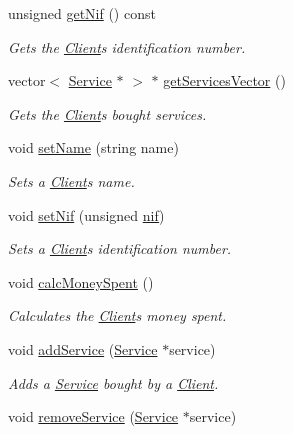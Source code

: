 \begin{DoxyCompactItemize}
unsigned \hyperlink{class_client_a35c9fed8cdb36d28fd5e51bd2aee852e}{get\+Nif} () const
\begin{DoxyCompactList}\small\item\em Gets the \hyperlink{class_client}{Client}\textquotesingle{}s identification number. \end{DoxyCompactList}\item 
vector$<$ \hyperlink{class_service}{Service} $\ast$ $>$ $\ast$ \hyperlink{class_client_a13ab3e2d37fde2de5b6a40d4523bb999}{get\+Services\+Vector} ()
\begin{DoxyCompactList}\small\item\em Gets the \hyperlink{class_client}{Client}\textquotesingle{}s bought services. \end{DoxyCompactList}\item 
void \hyperlink{class_client_a1c7f938360e23b3e0e52d17965f88725}{set\+Name} (string name)
\begin{DoxyCompactList}\small\item\em Sets a \hyperlink{class_client}{Client}\textquotesingle{}s name. \end{DoxyCompactList}\item 
void \hyperlink{class_client_a8d0ab1a3c654d361dacde7e1d2b92c94}{set\+Nif} (unsigned \hyperlink{class_client_a1c94dc96a56cb5032573fb1d528517c2}{nif})
\begin{DoxyCompactList}\small\item\em Sets a \hyperlink{class_client}{Client}\textquotesingle{}s identification number. \end{DoxyCompactList}\item 
void \hyperlink{class_client_a65027bc2da365dfdbbf0393ee2697586}{calc\+Money\+Spent} ()
\begin{DoxyCompactList}\small\item\em Calculates the \hyperlink{class_client}{Client}\textquotesingle{}s money spent. \end{DoxyCompactList}\item 
void \hyperlink{class_client_abf36aa7168464608e917fa40f1ba52db}{add\+Service} (\hyperlink{class_service}{Service} $\ast$service)
\begin{DoxyCompactList}\small\item\em Adds a \hyperlink{class_service}{Service} bought by a \hyperlink{class_client}{Client}. \end{DoxyCompactList}\item 
void \hyperlink{class_client_a018c06770de617bb404151e499206355}{remove\+Service} (\hyperlink{class_service}{Service} $\ast$service)

\end{DoxyCompactItemize}
